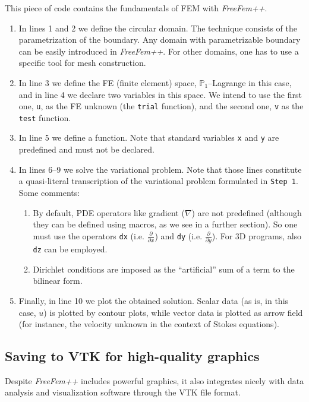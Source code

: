 \documentclass[12pt]{article}
\newcommand{\FF}{\textit{FreeFem++}\xspace}
\renewcommand{\P}{\mathbb{P}_}
\begin{document}
This piece of code contains the fundamentals of FEM with \FF.
\begin{enumerate}
\item In lines 1 and 2 we define the circular domain. The technique
  consists of the parametrization of the boundary. Any domain with
  parametrizable boundary can be easily introduced in \FF.  For other
  domains, one has to use a specific tool for mesh construction.
\item In line 3 we define the FE (finite element) space,
  $\P1$--Lagrange in this case, and in line 4 we declare two variables
  in this space. We intend to use the first one, \texttt{u}, as the FE
  unknown (the \texttt{trial} function), and the second one, \texttt{v}
  as the \texttt{test} function.
\item In line 5 we define a function. Note that standard variables
  \texttt{x} and \texttt{y} are predefined and must not be declared.
\item In lines 6--9 we solve the variational problem. Note that those
  lines constitute a quasi-literal transcription of the variational
  problem formulated in \texttt{Step 1}. Some comments:
  \begin{enumerate}
  \item By default, PDE operators like gradient ($\nabla$) are not
    predefined (although they can be defined using macros, as we see
    in a further section). So one must use the operators \texttt{dx}
    (i.e. $\frac{\partial}{\partial x}$) and \texttt{dy}
    (i.e. $\frac{\partial}{\partial y}$). For 3D programs, also \texttt{dz}
    can be employed.
  \item Dirichlet conditions are imposed as the ``artificial'' sum of
    a term to the bilinear form.
  \end{enumerate}

\item Finally, in line 10 we plot the obtained solution. Scalar data
  (as is, in this case, $u$) is plotted by contour plots, while vector
  data is plotted as arrow field (for instance, the velocity unknown
  in the context of Stokes equations).
\end{enumerate}

\subsection{Saving to VTK for high-quality graphics}

Despite \FF includes powerful graphics, it also integrates nicely with
data analysis and visualization software
through the VTK file format.
\end{document}
